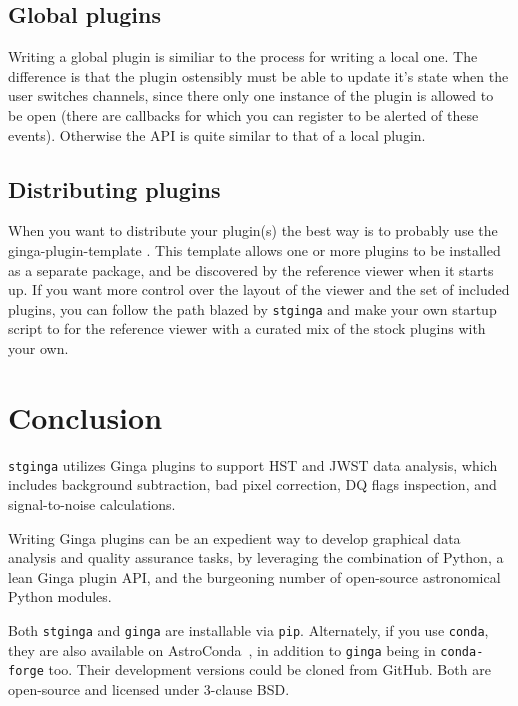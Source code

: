 \documentclass[11pt,twoside]{article}
\begin{document}
\subsection{Global plugins}
Writing a global plugin is similiar to the process for writing a local
one.  The difference is that the plugin ostensibly must be able to
update it's state when the user switches channels, since there only
one instance of the plugin is allowed to be open (there are callbacks
for which you can register to be alerted of these events).  Otherwise
the API is quite similar to that of a local plugin.

\subsection{Distributing plugins}
When you want to distribute your plugin(s) the best way is to probably use
the ginga-plugin-template \citep*{plugin-template}.  This template allows one
or more plugins to be installed as a separate package, and be
discovered by the reference viewer when it starts up.  If you want
more control over the layout of the viewer and the set of included
plugins, you can follow the path blazed by {\tt stginga} and make your own
startup script to for the reference viewer with a curated mix of the
stock plugins with your own.

\section{Conclusion}
{\tt stginga} utilizes Ginga plugins to support HST and JWST data analysis,
which includes background subtraction, bad pixel correction, DQ flags
inspection, and signal-to-noise calculations.

Writing Ginga plugins can be an expedient way to develop graphical data
analysis and quality assurance tasks, by leveraging the combination of
Python, a lean Ginga plugin API, and the burgeoning number of open-source
astronomical Python modules.

Both {\tt stginga} and {\tt ginga} are installable via {\tt pip}. Alternately,
if you use {\tt conda}, they are also available on AstroConda~\citep*{astroconda},
in addition to {\tt ginga} being in  {\tt conda-forge} too. Their development
versions could be cloned from GitHub. Both are open-source and licensed under
3-clause BSD.


\end{document}
